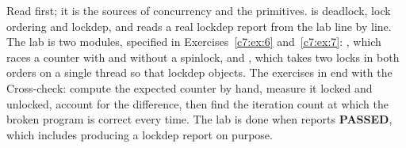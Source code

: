 Read  first; it is the sources of concurrency and the primitives.
 is deadlock, lock ordering and lockdep, and reads a real lockdep report from the
lab line by line. The lab is two modules, specified in Exercises~\ref{c7:ex:6} and~\ref{c7:ex:7}:
, which races a counter with and without a spinlock, and , which takes
two locks in both orders on a single thread so that lockdep objects. The exercises in
 end with the Cross-check: compute the expected counter by hand, measure it
locked and unlocked, account for the difference, then find the iteration count at which the broken
program is correct every time. The lab is done when  reports
\textbf{PASSED}, which includes producing a lockdep report on purpose.





